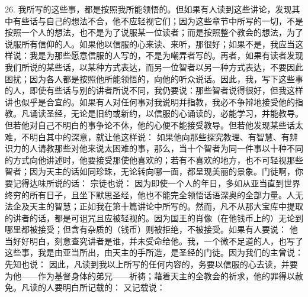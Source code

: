 26. 我所写的这些事，都是按照我所能领悟的。但如果有人读到这些讲论，发现其中有些话与自己的想法不合，他不应轻视它们；因为这些章节中所写的一切，不是按照一个人的想法，也不是为了说服某一位读者；而是按照整个教会的想法，为了说服所有信仰的人。如果他以信服的心来读、来听，那很好；如果不是，我应当这样说：我是为那些愿意信服的人写的，不是为嘲弄者写的。再者，如果有读者发现我们所说的某些话，以某种方式表达，而另一位智者以另一种方式表达，不要因此困扰；因为各人都是按照他所能领悟的，向他的听众说话。因此，我，写下这些事的人，即使有些话与别的讲者所说不同，我仍要说：那些智者说得很好，但我这样讲也似乎是合宜的。如果有人对任何事对我说明并指教，我必不争辩地接受他的指教。凡诵读圣经，无论是旧约或新约，以信服的心诵读的，必能学习，并能教导。但若他对自己不明白的事争论不休，他的心便不能接受教导。但若他发现某些话太难，不明白其中的深意，就让他这样说： 如果他向那些探究教理、有智慧、有辨识力的人请教那些对他来说太困难的事，那么，当十个智者为同一件事以十种不同的方式向他讲述时，他要接受那使他喜欢的；若有不喜欢的地方，也不可轻视那些智者；因为天主的话如同珍珠，无论转向哪一面，都呈现美丽的景象。门徒啊，你要记得达味所说的话： 宗徒也说： 因为即使一个人的年日，多如从亚当直到世界终穷的所有日子，且坐下默思圣经，他也不能完全领悟话语深奥的全部力量。人无法企及天主的智慧；正如我在第十篇讲论中所写的。然而，凡不从那大宝库中提取的讲者的话，都是可诅咒且应被轻视的。因为国王的肖像（在他钱币上的）无论到哪里都被接受；但含有杂质的（钱币）则被拒绝，不被接受。如果有人要说： 他当好好明白，刻意查究讲者是谁，并未受命给他。我，一个微不足道的人，也写了这些事，我是由亚当所出，由天主的手所造，是圣经的门徒。因为我们的主曾说：  先知也说：  因此，凡读到我以上所写的任何内容的，务要以信服的心去读，并要为他——作为基督身体的弟兄——祈祷；藉着天主的全教会的祈求，他的罪得以赦免。凡读的人要明白所记载的：  又记载说：     \par

